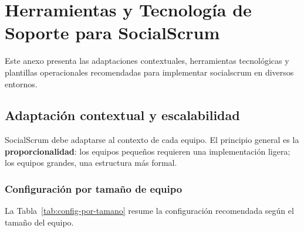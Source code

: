 \chapter{Herramientas y Tecnología de Soporte para SocialScrum}
\label{anexo:herramientas}

Este anexo presenta las adaptaciones contextuales, herramientas tecnológicas y plantillas operacionales recomendadas para implementar \gls{socialscrum} en diversos entornos.

\section{Adaptación contextual y escalabilidad}

SocialScrum debe adaptarse al contexto de cada equipo. El principio general es la \textbf{proporcionalidad}: los equipos pequeños requieren una implementación ligera; los equipos grandes, una estructura más formal.

\subsection{Configuración por tamaño de equipo}

La Tabla~\ref{tab:config-por-tamano} resume la configuración recomendada según el tamaño del equipo.

\begingroup
\scriptsize
\renewcommand{\arraystretch}{1.3}
\setlength{\tabcolsep}{4pt}
\setlength{\LTleft}{0pt}
\setlength{\LTright}{0pt}


